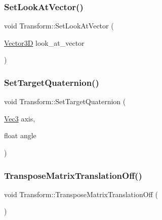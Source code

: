 \mbox{\label{class_transform_a39b78acbdbf3ee98cad0c4e640988745}} 
\subsubsection{\texorpdfstring{Set\+Look\+At\+Vector()}{SetLookAtVector()}}
{\footnotesize\ttfamily void Transform\+::\+Set\+Look\+At\+Vector (\begin{DoxyParamCaption}\item[{\mbox{\hyperlink{class_vector3_d}{Vector3D}}}]{look\+\_\+at\+\_\+vector }\end{DoxyParamCaption})}

\mbox{\label{class_transform_ac8cdb5ca9995d9c124f1890d84c92ab4}} 
\subsubsection{\texorpdfstring{Set\+Target\+Quaternion()}{SetTargetQuaternion()}}
{\footnotesize\ttfamily void Transform\+::\+Set\+Target\+Quaternion (\begin{DoxyParamCaption}\item[{\mbox{\hyperlink{_vector3_d_8h_ab16f59e4393f29a01ec8b9bbbabbe65d}{Vec3}}}]{axis,  }\item[{float}]{angle }\end{DoxyParamCaption})}

\mbox{\label{class_transform_a053037b225e6fb11e680cc60df15dd45}} 
\subsubsection{\texorpdfstring{Transpose\+Matrix\+Translation\+Off()}{TransposeMatrixTranslationOff()}}
{\footnotesize\ttfamily void Transform\+::\+Transpose\+Matrix\+Translation\+Off (\begin{DoxyParamCaption}{ }\end{DoxyParamCaption})\hspace{0.3cm}{\ttfamily [inline]}}

